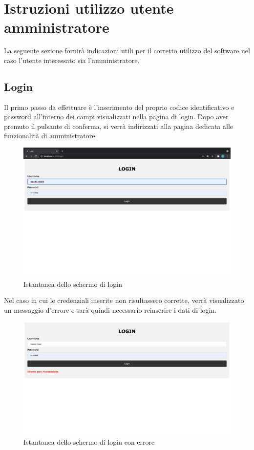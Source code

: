 \section{Istruzioni utilizzo utente amministratore}

La seguente sezione fornirà indicazioni utili per il corretto utilizzo del software nel caso l'utente interessato sia l'amministratore.

\subsection{Login}
Il primo passo da effettuare è l'inserimento del proprio codice identificativo e password all'interno dei campi visualizzati nella pagina di login. Dopo aver premuto il pulsante di conferma, si verrà indirizzati alla pagina dedicata alle funzionalità di amministratore. 
\begin{figure}[H]
    \centering
    \includegraphics[scale=0.12]{res/images/login.png}
    \caption{Istantanea dello schermo di login}
\end{figure}
Nel caso in cui le credenziali inserite non risultassero corrette, verrà visualizzato un messaggio d'errore e sarà quindi necessario reinserire i dati di login.
\begin{figure}[H]
    \centering
    \includegraphics[scale=0.2]{res/images/login_errato.png}
    \caption{Istantanea dello schermo di login con errore}
\end{figure}

